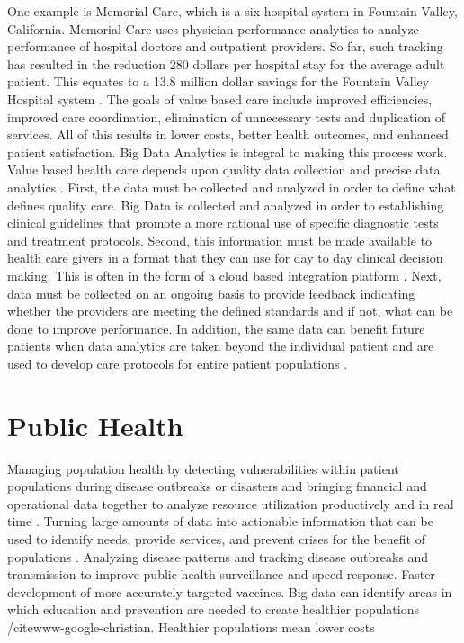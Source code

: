 \documentclass[sigconf]{acmart}
\begin{document}
One example is Memorial Care, which is a six hospital system in Fountain Valley, California. Memorial Care uses physician performance analytics to analyze performance of hospital doctors and outpatient providers.  So far, such tracking has resulted in the reduction 280 dollars per hospital stay for the average adult patient. This equates to a 13.8 million dollar savings for the Fountain Valley Hospital system \cite{www-google-Datafloq}.
The goals of value based care include improved efficiencies, improved care coordination, elimination of unnecessary tests and duplication of services.  All of this results in lower costs, better health outcomes, and enhanced patient satisfaction. 
Big Data Analytics is integral to making this process work. Value based health care depends upon quality data collection and precise data analytics \cite{www-google-liason}.  First, the data must be collected and analyzed in order to define what defines quality care. Big Data is collected and analyzed in order to establishing clinical guidelines that promote a more rational use of specific diagnostic tests and treatment protocols.  Second, this information must be made available to health care givers in a format that they can use for day to day clinical decision making. This is often in the form of a cloud based integration platform \cite{www-google-liason}.  Next, data must be collected on an ongoing basis to provide feedback indicating whether the providers are meeting the defined standards and if not, what can be done to improve performance. In addition, the same data can benefit future patients when data analytics are taken beyond the individual patient and are used to develop care protocols for entire patient populations \cite{www-google-liason}. 

\section{Public Health}
Managing population health by detecting vulnerabilities within patient populations during disease outbreaks or disasters and bringing financial and operational data together to analyze resource utilization productively and in real time \cite{springer}.
Turning large amounts of data into actionable information that can be used to identify needs, provide services, and prevent crises for the benefit of populations \cite{springer}.
Analyzing disease patterns and tracking disease outbreaks and transmission to improve public health surveillance and speed response. Faster development of more accurately targeted vaccines.  
Big data can identify areas in which education and prevention are needed to create healthier populations /cite{www-google-christian}. Healthier populations mean lower costs
\end{document}

